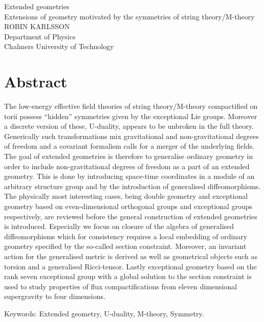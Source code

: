 Extended geometries\\
Extensions of geometry motivated by the symmetries of string theory/M-theory\\
ROBIN KARLSSON\\
Department of Physics\\
Chalmers University of Technology \setlength{\parskip}{0.5cm}

\thispagestyle{plain}			%
\setlength{\parskip}{0pt plus 1.0pt}
\section*{Abstract}
The low-energy effective field theories of string theory/M-theory compactified on torii possess ``hidden'' symmetries given by the exceptional Lie groups. Moreover a discrete version of these, U-duality, appears to be unbroken in the full theory. Generically such transformations mix gravitational and non-gravitational degrees of freedom and a covariant formalism calls for a merger of the underlying fields. The goal of extended geometries is therefore to generalise ordinary geometry in order to include non-gravitational degrees of freedom as a part of an extended geometry. This is done by introducing space-time coordinates in a module of an arbitrary structure group and by the introduction of generalised diffeomorphisms. The physically most interesting cases, being double geometry and exceptional geometry based on even-dimensional orthogonal groups and exceptional groups respectively, are reviewed before the general construction of extended geometries is introduced. Especially we focus on closure of the algebra of generalised diffeomorphisms which for consistency requires a local embedding of ordinary geometry specified by the so-called section constraint. Moreover, an invariant action for the generalised metric is derived as well as geometrical objects such as torsion and a generalised Ricci-tensor. Lastly exceptional geometry based on the rank seven exceptional group with a global solution to the section constraint is used to study properties of flux compactifications from eleven dimensional supergravity to four dimensions. 




\vfill
Keywords: Extended geometry, U-duality, M-theory, Symmetry.

\newpage				%
\thispagestyle{empty}
\mbox{}